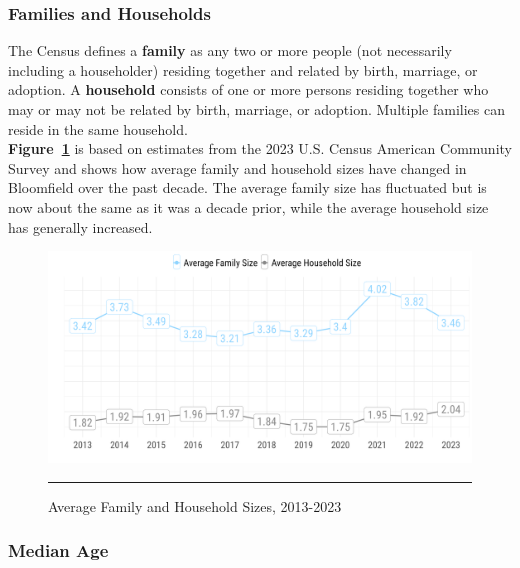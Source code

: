 

\pagebreak
\subsubsection*{Families and Households}
\noindent The Census defines a \textbf{family} as any two or more people (not necessarily including a householder) residing together and related by birth, marriage, or adoption. A \textbf{household} consists of one or more persons residing together who may or may not be related by birth, marriage, or adoption. Multiple families can reside in the same household.\\

\noindent \textbf{Figure~\ref{fig:householdSize}} is based on estimates from the 2023 U.S. Census American Community Survey and shows how average family and household sizes have changed in Bloomfield over the past decade. The average family size has fluctuated but is now about the same as it was a decade prior, while the average household size has generally increased.

\begin{figure}[H]
\centering
\begin{framed}
    \caption{Average Family and Household Sizes, 2013-2023}
    \label{fig:householdSize}
    \includegraphics[width=\linewidth]{figures/household_size.png}
    \rule[-5pt]{\linewidth}{0.4pt}
\end{framed}
\end{figure}

\pagebreak
\subsubsection*{Median Age}

